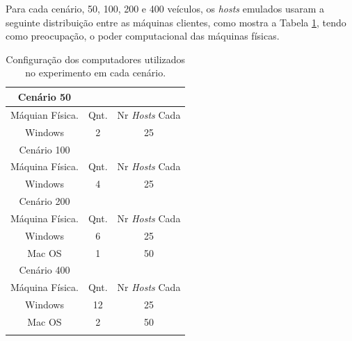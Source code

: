 \documentclass[
	12pt,				%
	oneside,			%
	a4paper,			%
	english,			%
	brazil				%
	]{abntex2ppgsi}
\begin{document}
Para cada cenário, 50, 100, 200 e 400 veículos, os \textit{hosts} emulados usaram a seguinte distribuição entre as máquinas clientes, como mostra a Tabela \ref{tab:configuracaoCenarios}, tendo como preocupação, o poder computacional das máquinas físicas.
%

\begin{longtable}{ |c |c |c |} 
	\hline
	\rowcolor[gray]{0.7}
	Cenário 50 &	& 	  \\ \hline
	\rowcolor[gray]{0.7}
	Máquian Física.	& Qnt. & Nr \textit{Hosts} Cada	 \\ \hline
	Windows	& 2 & 25 	\\ \hline
	\rowcolor[gray]{0.7}
	Cenário 100 &	& 	  \\ \hline
	\rowcolor[gray]{0.7}
	Máquina Física.	& Qnt. & Nr \textit{Hosts} Cada	 \\ \hline
	Windows	& 4 & 25 	\\ \hline
	\rowcolor[gray]{0.7}	
	Cenário 200 &	& 	  \\ \hline
	\rowcolor[gray]{0.7}
	Máquina Física.	& Qnt. & Nr \textit{Hosts} Cada	 \\ \hline
	Windows	& 6 & 25 	\\ \hline
	Mac OS	& 1 & 50 	\\ \hline
	\rowcolor[gray]{0.7}	
	Cenário 400 &	& 	  \\ \hline
	\rowcolor[gray]{0.7}
	Máquina Física.	& Qnt. & Nr \textit{Hosts} Cada	 \\ \hline
	Windows	& 12 & 25 	\\ \hline
	Mac OS	& 2 & 50 	\\ \hline
	\caption{Configuração dos computadores utilizados no experimento em cada cenário. } 
	\label{tab:configuracaoCenarios}
\end{longtable}
\end{document}
